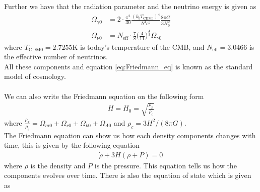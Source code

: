 \documentclass{article}
\begin{document}
\begin{multicols}{2}
Further we have that the radiation parameter and the neutrino energy is given as 
\begin{align}
    \Omega_{\gamma0}&= 2\cdot \frac{\pi^2}{30}\frac{(k_bT_{\text{CDM}0})^4}{\hbar^3c^5}\frac{8\pi G}{3H_0^2}\\
    \Omega_{\nu0}&=N_\text{eff}\cdot\frac{7}{8}\bigg(\frac{4}{11}\bigg)^\frac{4}{3}\Omega_{\gamma0}
\end{align}
where $T_{\text{CDM}0}=2.7255$K is today's temperature of the CMB, and $N_\text{eff}=3.0466$ is the effective number of neutrinos. \\
All these components and equation \eqref{eq:Friedmann_eq} is known as the standard model of cosmology.\\   
\\
We can also write the Friedmann equation on the following form
\begin{align}
    H=H_0=\sqrt{\frac{\rho_x}{\rho_c}} \label{eq:H_rho}
\end{align}
where $\frac{\rho_x}{\rho_c}=\Omega_{m0}+\Omega_{r0}+\Omega_{k0}+\Omega_{\Lambda 0}$ and $\rho_c=3H^2/(8\pi G)$.\\
The Friedmann equation can show us how each density components changes with time, this is given by the following equation
\begin{align}
    \Dot{\rho}+3H(\rho+P)=0
\end{align}
where $\rho$ is the density and $P$ is the pressure. This equation tells us how the components evolves over time. There is also the equation of state which is given as


\end{multicols}
\end{document}
